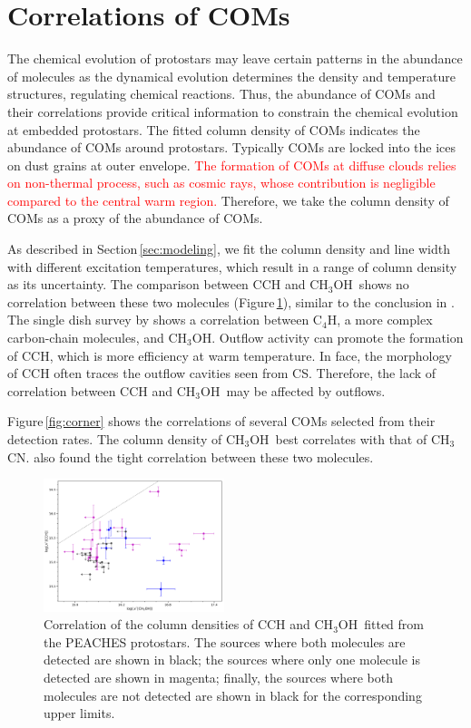 \documentclass[twocolumn]{aastex62}
\newcommand{\methanol}{\mbox{CH$_{3}$OH}}
\newcommand{\methylcyanide}{\mbox{CH$_{3}$CN}}
\begin{document}
\section{Correlations of COMs}
The chemical evolution of protostars may leave certain patterns in the abundance of molecules as the dynamical evolution determines the density and temperature structures, regulating chemical reactions.  Thus, the abundance of COMs and their correlations provide critical information to constrain the chemical evolution at embedded protostars.  The fitted column density of COMs indicates the abundance of COMs around protostars.  Typically COMs are locked into the ices on dust grains at outer envelope.  \textcolor{red}{The formation of COMs at diffuse clouds relies on non-thermal process, such as cosmic rays, whose contribution is negligible compared to the central warm region.}  Therefore, we take the column density of COMs as a proxy of the abundance of COMs.  

As described in Section\,\ref{sec:modeling}, we fit the column density and line width with different excitation temperatures, which result in a range of column density as its uncertainty.  The comparison between CCH and \methanol\ shows no correlation between these two molecules (Figure\,\ref{fig:cch_ch3oh}), similar to the conclusion in \citet{2018ApJS..236...52H}.  The single dish survey by \citet{2016ApJ...833..125G} shows a correlation between C$_{4}$H, a more complex carbon-chain molecules, and \methanol.  Outflow activity can promote the formation of CCH, which is more efficiency at warm temperature.  In face, the morphology of CCH often traces the outflow cavities seen from CS.  Therefore, the lack of correlation between CCH and \methanol\ may be affected by outflows.

Figure\,\ref{fig:corner} shows the correlations of several COMs selected from their detection rates.  The column density of \methanol\ best correlates with that of \methylcyanide.  \citet{2020A&A...635A.198B} also found the tight correlation between these two molecules.


\begin{figure}[htbp!]
  \centering
  \includegraphics[width=0.47\textwidth]{Ncol_ch3oh_cch.pdf}
  \caption{Correlation of the column densities of CCH and \methanol\ fitted from the PEACHES protostars.  The sources where both molecules are detected are shown in black; the sources where only one molecule is detected are shown in magenta; finally, the sources where both molecules are not detected are shown in black for the corresponding upper limits.}
  \label{fig:cch_ch3oh}
\end{figure}
\end{document}
